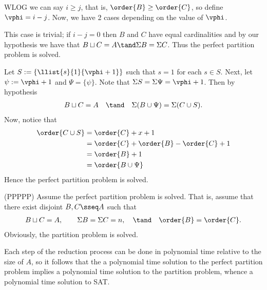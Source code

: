 \documentclass{article}
\begin{document}
\begin{solution}
\begin{subproof}[Correctness.]
    WLOG we can say $ i \geq j $, that is, $ \order{B} \geq \order{C} $, so define $ \vphi = i-j $.
    Now, we have 2 cases depending on the value of $ \vphi $.
    \begin{subproof}[Case 1 ($ \vphi = 0 $).]
      This case is trivial; if $ i-j =0 $ then $ B $ and $ C $ have equal cardinalities and by our hypothesis we have that $ B\sqcup C = A \tand \Sigma B = \Sigma C $.
      Thus the perfect partition problem is solved.
    \end{subproof}
    \begin{subproof}
      Let $ S := \{\llist{s}{1}{\vphi+1} \} $ such that $ s = 1 $ for each $ s\in S $.
      Next, let $ \psi := \vphi + 1 $ and $ \Psi = \{\psi\} $.
      Note that $ \Sigma S = \Sigma \Psi = \vphi+1 $.
      Then by hypothesis \begin{align*}
        B\sqcup C = A \quad \tand \quad \Sigma (B\cup \Psi) = \Sigma (C\cup S).
      \end{align*}
      Now, notice that \begin{align*}
        \order{C\cup S}&=\order{C} + x + 1 \\
        &= \order{C} + \order{B}-\order{C} + 1\\
        &= \order{B} + 1 \\
        &= \order{B\cup \Psi}
      \end{align*}
      Hence the perfect partition problem is solved.
    \end{subproof}

    (PP\pmi PPP)
    Assume the perfect partition problem is solved.
    That is, assume that there exist disjoint $ B,C\sseq A $ such that
    \begin{align*}
      B\sqcup C = A, \qquad \Sigma B = \Sigma C = n, \quad \tand \quad \order{B}=\order{C}.
    \end{align*}
    Obviously, the partition problem is solved.
  \end{subproof}
  Each step of the reduction process can be done in polynomial time relative to the size of $ A $, so it follows that the a polynomial time solution to the perfect partition problem implies a polynomial time solution to the partition problem, whence a polynomial time solution to SAT.
\end{solution}
\pagebreak
\end{document}
